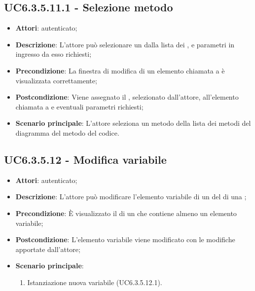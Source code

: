 \subsection{UC6.3.5.11.1 - Selezione metodo}
\label{ssec:UC6.3.5.11.1}
\begin{itemize}
\item \textbf{Attori}:  autenticato;
\item \textbf{Descrizione}: L'attore può selezionare un  dalla lista dei , e parametri in ingresso da esso richiesti;
\item \textbf{Precondizione}: La finestra di modifica di un elemento chiamata a  è visualizzata correttamente;
\item \textbf{Postcondizione}: Viene assegnato il , selezionato dall'attore, all'elemento chiamata a  e eventuali parametri richiesti;
\item \textbf{Scenario principale}: L'attore seleziona un metodo della lista dei metodi del diagramma del metodo del codice.
\end{itemize}
\subsection{UC6.3.5.12 - Modifica variabile}
\label{ssec:UC6.3.5.12}
\begin{itemize}
\item \textbf{Attori}:  autenticato;
\item \textbf{Descrizione}: L'attore può modificare l'elemento variabile di un  del  di una ;
\item \textbf{Precondizione}: È visualizzato il  di un  che contiene almeno un elemento variabile;
\item \textbf{Postcondizione}: L'elemento variabile viene modificato con le modifiche apportate dall'attore;
\item \textbf{Scenario principale}: \begin{enumerate}\item Istanziazione nuova variabile (UC6.3.5.12.1).
 \end{enumerate}
\end{itemize}
